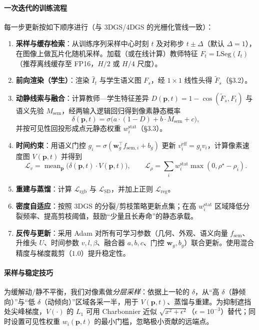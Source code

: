 \documentclass[10pt,conference]{IEEEtran} %
\begin{document}
\paragraph{一次迭代的训练流程}
每一步更新按如下顺序进行（与 3DGS/4DGS 的光栅化管线一致）：
\begin{enumerate}
  \item \textbf{采样与缓存检索}：从训练序列采样中心时刻 $t$ 及对称步 $t\pm\Delta$（默认 $\Delta{=}1$），在图像上做瓦片化随机采样。加载（或在线计算）教师特征 $F_t=\mathrm{LSeg}(I_t)$（推荐离线缓存至 FP16，$H/2$ 或 $H/4$ 尺度）。
  \item \textbf{前向渲染（学生）}：渲染 $\hat I_t$ 与学生语义图 $F_s$，经 $1{\times}1$ 线性头得 $\tilde F_s$（§3.2）。
  \item \textbf{动静线索与融合}：计算教师—学生特征差异 $D(\mathbf p,t){=}1{-}\cos(\tilde F_s,F_t)$ 与语义先验 $M_{\mathrm{sem}}$，经两输入逻辑回归得到像素静态概率
  \[
  \delta(\mathbf p,t)=\sigma\!\big(a\cdot(1{-}D)+b\cdot M_{\mathrm{sem}}+c\big),
  \]
  并按可见性回投形成点元静态权重 $w_i^{\mathrm{stat}}$（§3.3）。
  \item \textbf{时间约束}：用语义门控 $g_i=\sigma(\mathbf w_g^\top f_{\mathrm{sem},i}+b_g)$ 更新 $v_i^{\mathrm{eff}}{=}g_i v_i$，计算像素速度图 $V(\mathbf p,t)$ 并得到
  \[
  \mathcal L_v=\operatorname{mean}_{\mathbf p}\big(\delta(\mathbf p,t)\cdot V(\mathbf p,t)\big),\qquad
  \mathcal L_\rho=\sum_i w_i^{\mathrm{stat}}\max(0,\rho^\star-\rho_i) .
  \]
  \item \textbf{重建与蒸馏}：计算 $\mathcal L_{\mathrm{rgb}}$ 与 $\mathcal L_{\mathrm{SD}}$，并加上正则 $\mathcal L_{\mathrm{reg}}$。
  \item \textbf{密度自适应}：按照 3DGS 的分裂/剪枝策略更新点集；在高 $w_i^{\mathrm{stat}}$ 区域降低分裂频率、提高剪枝阈值，鼓励“少量且长寿命”的静态承载。
  \item \textbf{反传与更新}：采用 Adam 对所有可学习参数（几何、外观、语义向量 $f_{\mathrm{sem}}$、升维头 $U$、时间参数 $v,l,\beta$、融合器 $a,b,c$、门控 $\mathbf w_g,b_g$）联合更新。使用混合精度与梯度裁剪（$1.0$）提升稳定性。
\end{enumerate}

\paragraph{采样与稳定技巧}
为缓解动/静不平衡，我们对像素做\emph{分层采样}：依据上一轮的 $\delta$，从“高 $\delta$（静倾向）”与“低 $\delta$（动倾向）”区域各采一半，用于 $V(\mathbf p,t)$、蒸馏与重建。为抑制遮挡处尖峰梯度，$V(\cdot)$ 的 $L_1$ 可用 Charbonnier 近似 $\sqrt{x^2+\epsilon^2}$（$\epsilon{=}10^{-3}$）替代；同时设置可见性权重 $w_i(\mathbf p,t)$ 的最小门槛，忽略极小贡献的远端点。
\end{document}
